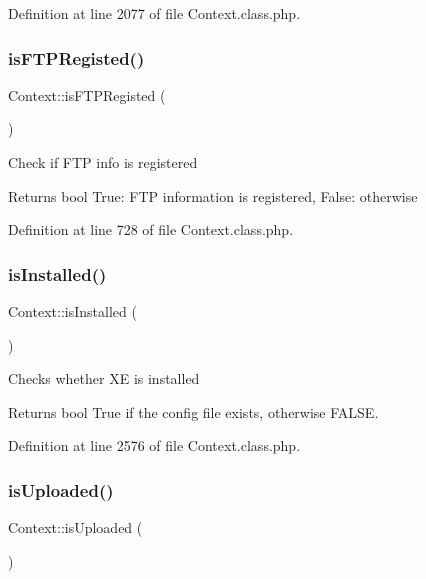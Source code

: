Definition at line 2077 of file Context.\+class.\+php.

\hypertarget{classContext_aee42b43176df53b80d5bbf8f6ce14459}{}\label{classContext_aee42b43176df53b80d5bbf8f6ce14459} 
\subsubsection{\texorpdfstring{is\+F\+T\+P\+Registed()}{isFTPRegisted()}}
{\footnotesize\ttfamily Context\+::is\+F\+T\+P\+Registed (\begin{DoxyParamCaption}{ }\end{DoxyParamCaption})}

Check if F\+TP info is registered

\begin{DoxyReturn}{Returns}
bool True\+: F\+TP information is registered, False\+: otherwise 
\end{DoxyReturn}


Definition at line 728 of file Context.\+class.\+php.

\hypertarget{classContext_a5a8714e3a0f9d4722a31ce73017c6613}{}\label{classContext_a5a8714e3a0f9d4722a31ce73017c6613} 
\subsubsection{\texorpdfstring{is\+Installed()}{isInstalled()}}
{\footnotesize\ttfamily Context\+::is\+Installed (\begin{DoxyParamCaption}{ }\end{DoxyParamCaption})}

Checks whether XE is installed

\begin{DoxyReturn}{Returns}
bool True if the config file exists, otherwise F\+A\+L\+SE. 
\end{DoxyReturn}


Definition at line 2576 of file Context.\+class.\+php.

\hypertarget{classContext_a65ee4d61d0211c8a3f0eeb4251c85892}{}\label{classContext_a65ee4d61d0211c8a3f0eeb4251c85892} 
\subsubsection{\texorpdfstring{is\+Uploaded()}{isUploaded()}}
{\footnotesize\ttfamily Context\+::is\+Uploaded (\begin{DoxyParamCaption}{ }\end{DoxyParamCaption})}

